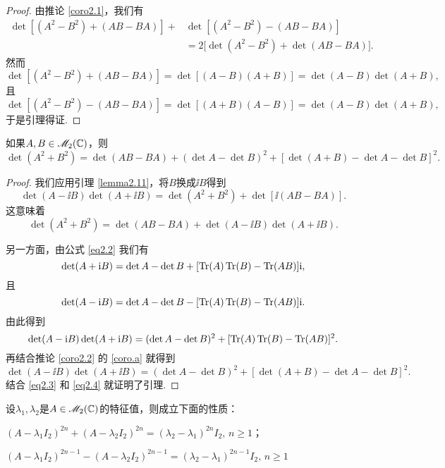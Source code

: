 \begin{proof}
  由推论 \ref{coro2.1}，我们有
  \begin{align*}
    \det[(A^2 - B^2) + (AB - BA)] + &\det [(A^2 - B^2) - (AB - BA)] \\
    & = 2\big[ \det(A^2 - B^2) + \det(AB - BA) \big].
  \end{align*}
  然而
  \[
    \det [ (A^2 - B^2) + (AB - BA) ] = \det [ (A - B)(A + B) ] = \det (A - B) \det (A + B),
  \]
  且
  \[
    \det [ (A^2 - B^2) - (AB - BA) ] = \det [(A + B) (A - B)]  = \det (A - B) \det (A + B),
  \]
  于是引理得证.
\end{proof}

\begin{lemma}
  如果$A,B\in\mathscr M_2(\mathbb C)$，则
  \[
    \det (A^2 + B^2) = \det (AB - BA) + (\det A - \det B)^2 + [ \det (A + B) - \det A - \det B ]^2.
  \]
\end{lemma}

\begin{proof}
  我们应用引理 \ref{lemma2.11}，将$B$换成$\ii B$得到
  \[
    \det (A - \ii B) \det (A + \ii B) = \det (A^2 + B^2) + \det [\ii (AB - BA)].
  \]
  这意味着
  \begin{equation}\label{eq2.3}
    \det (A^2 + B^2) = \det (AB - BA) + \det (A - \ii B) \det (A + \ii B).
  \end{equation}

  另一方面，由公式 \eqref{eq2.2} 我们有
  \[
    \det (A + \mathrm i B) = \det A - \det B + [\operatorname{Tr}(A)\operatorname{Tr}(B) - \operatorname{Tr}(AB)] \mathrm i,
  \]
  且
  \[
    \det (A - \mathrm i B) = \det A - \det B - [\operatorname{Tr}(A)\operatorname{Tr}(B) - \operatorname{Tr}(AB)] \mathrm i.
  \]
  由此得到
  \[
    \det (A - \mathrm i B) \det (A + \mathrm i B) = (\det A - \det B)^2 + [\operatorname{Tr}(A)\operatorname{Tr}(B) - \operatorname{Tr}(AB)]^2.
  \]
  再结合推论 \ref{coro2.2} 的 \ref{coro.a} 就得到
  \begin{equation}\label{eq2.4}
    \det (A - \ii B) \det (A + \ii B) = (\det A - \det B)^2 + [\det (A + B) - \det A - \det B]^2.
  \end{equation}
  结合 \eqref{eq2.3} 和 \eqref{eq2.4} 就证明了引理.

\end{proof}

\begin{mybox}
  \begin{theorem}[矩阵幂等式]

    设$\lambda_1,\lambda_2$是$A\in\mathscr M_2(\mathbb C)$的特征值，则成立下面的性质：
    \begin{enum}
      \item \label{thm2.4.a} $(A-\lambda_1I_2)^{2n}+(A-\lambda_2I_2)^{2n}
          =(\lambda_2-\lambda_1)^{2n}I_2,\,n\ge1$；
      \item \label{thm2.4.b} $(A-\lambda_1I_2)^{2n-1}-(A-\lambda_2I_2)^{2n-1}
          =(\lambda_2-\lambda_1)^{2n-1}I_2,\,n\ge1$
    \end{enum}
  \end{theorem}
\end{mybox}

